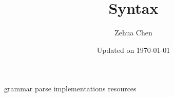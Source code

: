 \documentclass{report}
\title{Syntax}
\author{Zehua Chen}
\date{Updated on \today}
\begin{document}
  \maketitle
  \tableofcontents

  \setmainstyles

  {grammar}
  {parse}
  {implementations}
  {resources}
\end{document}
